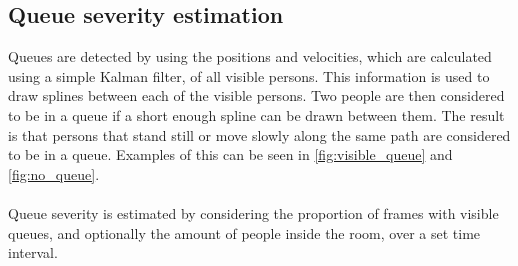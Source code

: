 \subsection{Queue severity estimation}
Queues are detected by using the positions and velocities, which are calculated using a simple Kalman filter, of all visible persons. This information is used to draw splines between each of the visible persons. Two people are then considered to be in a queue if a short enough spline can be drawn between them. The result is that persons that stand still or move slowly along the same path are considered to be in a queue. Examples of this can be seen in \ref{fig:visible_queue} and \ref{fig:no_queue}.
\\ \\
Queue severity is estimated by considering the proportion of frames with visible queues, and optionally the amount of people inside the room, over a set time interval. 
